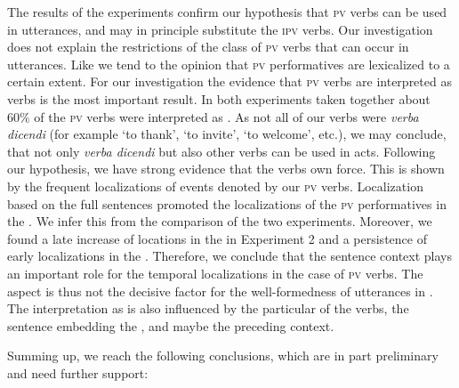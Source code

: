 \documentclass[output=paper,colorlinks,citecolor=brown,newtxmath,hidelinks]{langscibook}
\begin{document}
The results of the experiments confirm our hypothesis that \textsc{pv}  verbs can be used in  utterances, and may in principle substitute the \textsc{ipv}  verbs. Our investigation does not explain the restrictions of the class of \textsc{pv} verbs that can occur in  utterances. Like \citet{Wiemer2014} we tend to the opinion that \textsc{pv} performatives are lexicalized to a certain extent. For our investigation the evidence that \textsc{pv}  verbs are interpreted as  verbs is the most important result. In both experiments taken together about $60\%$ of the \textsc{pv}  verbs were interpreted as  . As not all of our  verbs were \textit{verba dicendi} (for example ‘to thank’, ‘to invite’, ‘to welcome’, etc.), we may conclude, that not only \textit{verba dicendi} but also other  verbs can be used in  acts. Following our hypothesis, we have strong evidence that the    verbs own  force. This is shown by the frequent  localizations of events denoted by our \textsc{pv}  verbs. Localization based on the full sentences promoted the localizations of the \textsc{pv} performatives in the . We infer this from the comparison of the two experiments. Moreover, we found a late increase of locations in the  in Experiment 2 and a persistence of early localizations in the . Therefore, we conclude that the sentence context plays an important role for the temporal localizations in the case of \textsc{pv}  verbs. The  aspect is thus not the decisive factor for the well-formedness of  utterances in . The interpretation as  is also influenced by the particular  of the  verbs, the sentence embedding the , and maybe the preceding context.

Summing up, we reach the following conclusions, which are in part preliminary and need further support:
\end{document}
